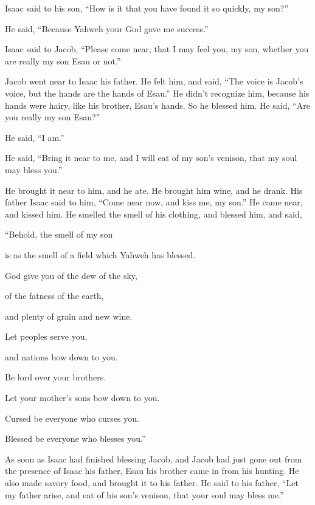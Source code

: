 {\par }{\PP {}Isaac said to his son, “How is it that you have found it so quickly, my son?”
\par }{\PP He said, “Because Yahweh your God gave me success.”
\par }{\PP {}Isaac said to Jacob, “Please come near, that I may feel you, my son, whether you are really my son Esau or not.”
\par }{\PP {}Jacob went near to Isaac his father. He felt him, and said, “The voice is Jacob’s voice, but the hands are the hands of Esau.”
He didn’t recognize him, because his hands were hairy, like his brother, Esau’s hands. So he blessed him.
He said, “Are you really my son Esau?”
\par }{\PP He said, “I am.”
\par }{\PP {}He said, “Bring it near to me, and I will eat of my son’s venison, that my soul may bless you.”
\par }{\PP He brought it near to him, and he ate. He brought him wine, and he drank.
His father Isaac said to him, “Come near now, and kiss me, my son.”
He came near, and kissed him. He smelled the smell of his clothing, and blessed him, and said,
\par }{\Q “Behold, the smell of my son
\par }{\QB is as the smell of a field which Yahweh has blessed.
\par }{\Q {}God give you of the dew of the sky,
\par }{\QB of the fatness of the earth,
\par }{\QB and plenty of grain and new wine.
\par }{\Q {}Let peoples serve you,
\par }{\QB and nations bow down to you.
\par }{\Q Be lord over your brothers.
\par }{\QB Let your mother’s sons bow down to you.
\par }{\Q Cursed be everyone who curses you.
\par }{\QB Blessed be everyone who blesses you.”
\par }{\PP {}As soon as Isaac had finished blessing Jacob, and Jacob had just gone out from the presence of Isaac his father, Esau his brother came in from his hunting.
He also made savory food, and brought it to his father. He said to his father, “Let my father arise, and eat of his son’s venison, that your soul may bless me.”
}
